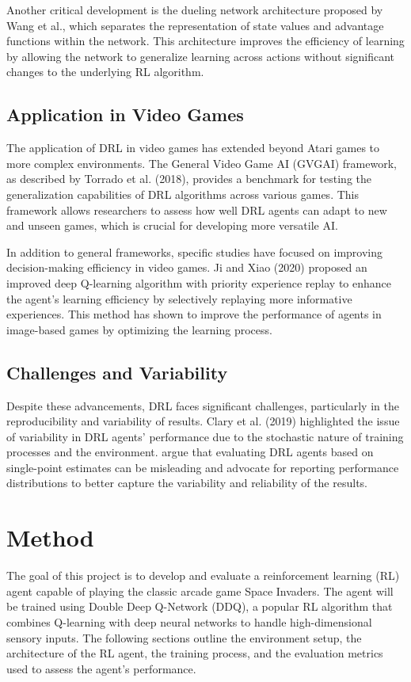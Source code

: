 \documentclass[preprint,12pt,3p,times]{elsarticle}
\begin{document}
Another critical development is the dueling network architecture proposed by Wang et al., which separates the representation of state values and advantage functions within the network. This architecture improves the efficiency of learning by allowing the network to generalize learning across actions without significant changes to the underlying RL algorithm\cite{wang2016dueling}.

\subsection{Application in Video Games}
The application of DRL in video games has extended beyond Atari games to more complex environments. The General Video Game AI (GVGAI) framework, as described by Torrado et al. (2018), provides a benchmark for testing the generalization capabilities of DRL algorithms across various games\cite{torrado2018deep}. This framework allows researchers to assess how well DRL agents can adapt to new and unseen games, which is crucial for developing more versatile AI.

In addition to general frameworks, specific studies have focused on improving decision-making efficiency in video games. Ji and Xiao (2020) proposed an improved deep Q-learning algorithm with priority experience replay to enhance the agent's learning efficiency by selectively replaying more informative experiences\cite{ji2020improving}. This method has shown to improve the performance of agents in image-based games by optimizing the learning process.

\subsection{Challenges and Variability}
Despite these advancements, DRL faces significant challenges, particularly in the reproducibility and variability of results. Clary et al. (2019) highlighted the issue of variability in DRL agents' performance due to the stochastic nature of training processes and the environment\cite{clary2019let}. argue that evaluating DRL agents based on single-point estimates can be misleading and advocate for reporting performance distributions to better capture the variability and reliability of the results.

\section{Method}

The goal of this project is to develop and evaluate a reinforcement learning (RL) agent capable of playing the classic arcade game Space Invaders. The agent will be trained using Double Deep Q-Network (DDQ), a popular RL algorithm that combines Q-learning with deep neural networks to handle high-dimensional sensory inputs. The following sections outline the environment setup, the architecture of the RL agent, the training process, and the evaluation metrics used to assess the agent's performance.
\end{document}
